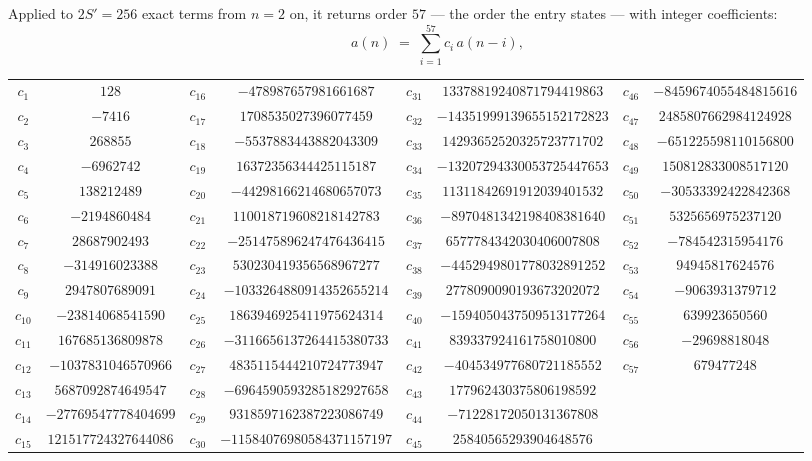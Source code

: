 \documentclass[11pt,a4paper]{article}
\theoremstyle{plain}
\theoremstyle{definition}
\begin{document}
Applied to $2S'=256$ exact terms from $n=2$ on, it returns order $57$ --- the
order the entry states --- with integer coefficients:
\[
a(n)\;=\;\sum_{i=1}^{57}c_i\,a(n-i),
\]
\begin{center}\small
\begin{tabular}{cccccccc}
$c_{1}$ & $128$ & $c_{16}$ & $-478987657981661687$ & $c_{31}$ & $13378819240871794419863$ & $c_{46}$ & $-8459674055484815616$ \\
$c_{2}$ & $-7416$ & $c_{17}$ & $1708535027396077459$ & $c_{32}$ & $-14351999139655152172823$ & $c_{47}$ & $2485807662984124928$ \\
$c_{3}$ & $268855$ & $c_{18}$ & $-5537883443882043309$ & $c_{33}$ & $14293652520325723771702$ & $c_{48}$ & $-651225598110156800$ \\
$c_{4}$ & $-6962742$ & $c_{19}$ & $16372356344425115187$ & $c_{34}$ & $-13207294330053725447653$ & $c_{49}$ & $150812833008517120$ \\
$c_{5}$ & $138212489$ & $c_{20}$ & $-44298166214680657073$ & $c_{35}$ & $11311842691912039401532$ & $c_{50}$ & $-30533392422842368$ \\
$c_{6}$ & $-2194860484$ & $c_{21}$ & $110018719608218142783$ & $c_{36}$ & $-8970481342198408381640$ & $c_{51}$ & $5325656975237120$ \\
$c_{7}$ & $28687902493$ & $c_{22}$ & $-251475896247476436415$ & $c_{37}$ & $6577784342030406007808$ & $c_{52}$ & $-784542315954176$ \\
$c_{8}$ & $-314916023388$ & $c_{23}$ & $530230419356568967277$ & $c_{38}$ & $-4452949801778032891252$ & $c_{53}$ & $94945817624576$ \\
$c_{9}$ & $2947807689091$ & $c_{24}$ & $-1033264880914352655214$ & $c_{39}$ & $2778090090193673202072$ & $c_{54}$ & $-9063931379712$ \\
$c_{10}$ & $-23814068541590$ & $c_{25}$ & $1863946925411975624314$ & $c_{40}$ & $-1594050437509513177264$ & $c_{55}$ & $639923650560$ \\
$c_{11}$ & $167685136809878$ & $c_{26}$ & $-3116656137264415380733$ & $c_{41}$ & $839337924161758010800$ & $c_{56}$ & $-29698818048$ \\
$c_{12}$ & $-1037831046570966$ & $c_{27}$ & $4835115444210724773947$ & $c_{42}$ & $-404534977680721185552$ & $c_{57}$ & $679477248$ \\
$c_{13}$ & $5687092874649547$ & $c_{28}$ & $-6964590593285182927658$ & $c_{43}$ & $177962430375806198592$ &  &  \\
$c_{14}$ & $-27769547778404699$ & $c_{29}$ & $9318597162387223086749$ & $c_{44}$ & $-71228172050131367808$ &  &  \\
$c_{15}$ & $121517724327644086$ & $c_{30}$ & $-11584076980584371157197$ & $c_{45}$ & $25840565293904648576$ &  &  \\
\end{tabular}
\end{center}
\end{document}
